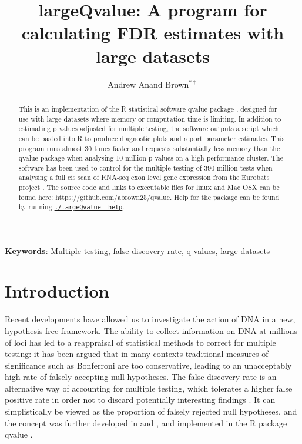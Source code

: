 \documentclass{amsart}
\author[]{Andrew Anand Brown$^{*\dagger}$}
\title[largeQvalue]{largeQvalue: A program for calculating FDR estimates with large datasets}
\begin{document}
\maketitle

\linespread{1.6}

\begin{abstract}
This is an implementation of the R statistical software qvalue package \citep{qvalue}, designed for use with large datasets where memory or computation time is limiting. In addition to estimating p values adjusted for multiple testing, the software outputs a script which can be pasted into R to produce diagnostic plots and report parameter estimates. This program runs almost 30 times faster and requests substantially less memory than the qvalue package when analysing 10 million p values on a high performance cluster. The software has been used to control for the multiple testing of 390 million tests when analysing a full cis scan of RNA-seq exon level gene expression from the Eurobats project \citep{brownepistasis}. The source code and links to executable files for linux and Mac OSX can be found here: \url{https://github.com/abrown25/qvalue}. Help for the package can be found by running \underline{\texttt{./largeQvalue --help}}.
\end{abstract}

\bigskip

\noindent \small{\textbf{Keywords}: Multiple testing, false discovery rate, q values, large datasets}

\bigskip

\section{Introduction}

Recent developments have allowed us to investigate the action of DNA in a new, hypothesis free framework. The ability to collect information on DNA at millions of loci has led to a reappraisal of statistical methods to correct for multiple testing: it has been argued that in many contexts traditional measures of significance such as Bonferroni are too conservative, leading to an unacceptably high rate of falsely accepting null hypotheses. The false discovery rate is an alternative way of accounting for multiple testing, which tolerates a higher false positive rate in order not to discard potentially interesting findings \citep{fdr}. It can simplistically be viewed as the proportion of falsely rejected null hypotheses, and the concept was further developed in \citet{splinestorey} and \citet{bootstorey}, and implemented in the R package qvalue \citep{qvalue}.
\end{document}
